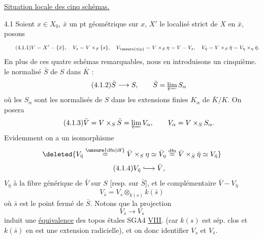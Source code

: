 
  \uline{Situation locale des cinq schémas.}

4.1 Soient  $x\in X_0$, $\bar x$ un pt géométrique sur $x$, $X'$ le localisé strict de $X$ en $\bar x$, posons
\[
\tag*{(4.1.1)}
V=X'-\{\bar x\},\quad V_s=V\times_S\{s\},\quad
V_{\unsure{\eta|y}}=V\times_S\eta=V-V_s,\quad
V_{\bar\eta}=V\times_S\bar\eta=V_\eta\times_\eta\bar\eta.
\]
En plus de ces quatre schémas remarquables, nous en introduisons un cinquième.    le normalisé $\bar S$ de $S$ dans $\bar K$ :
\[
\tag*{(4.1.2)}
\bar S\longrightarrow S,\qquad \bar S=\varprojlim S_\alpha
\]
où les $S_\alpha$ sont les normalisés de $S$ dans les extensions finies  $K_\alpha$ de $\bar K/K$. \deleted{+} On posera
\[
\tag*{(4.1.3)}
\bar V=V\times_S\bar S=\varprojlim V_\alpha,\qquad V_\alpha=V\times_S S_\alpha.
\]
Evidemment on a un isomorphisme
\[
\deleted{V_{\bar\eta}\overset{\unsure{\mathrm{dfn}|\mathrm{df}}}{=}\bar V\times_S\eta
\simeq\bar V_\eta\overset{\mathrm{dfn}}{=}\bar V\times_{\bar S}\bar\eta\simeq V_{\bar\eta}}
\]
\[
\tag*{(4.1.4)}
V_{\bar\eta}\lhook\joinrel\longrightarrow\bar V,
\]
 $V_{\bar\eta}$ à la fibre générique de $\bar V$ sur $S$ [resp. sur $\bar S$], et le complémentaire  $\bar V-V_{\bar\eta}$   
\[
\tag*{(4.1.5).}
V_{\bar s}=V_s\otimes_{k(s)}k(\bar s)
\]
où $\bar s$ est le point fermé de $\bar S$. Notons que la projection
\[
\tag*{(4.1.6)}
V_{\bar s}\longrightarrow V_s
\]
induit une \uline{équivalence} des topos étales  SGA4 \uline{VIII}. (car $k(s)$ est sép. clos et $k(\bar s)$ en est une extension radicielle), et on   donc identifier $V_s$ et $V_{\bar s}$.
